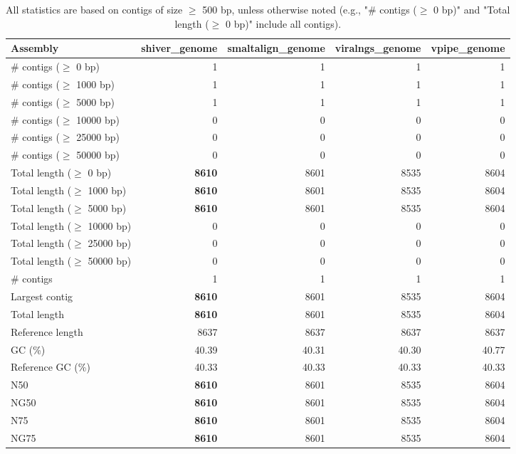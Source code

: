 \documentclass[12pt,a4paper]{article}
\begin{document}
\begin{table}[ht]
\begin{center}
\caption{All statistics are based on contigs of size $\geq$ 500 bp, unless otherwise noted (e.g., "\# contigs ($\geq$ 0 bp)" and "Total length ($\geq$ 0 bp)" include all contigs).}
\begin{tabular}{|l*{4}{|r}|}
\hline
Assembly & shiver\_genome & smaltalign\_genome & viralngs\_genome & vpipe\_genome \\ \hline
\# contigs ($\geq$ 0 bp) & 1 & 1 & 1 & 1 \\ \hline
\# contigs ($\geq$ 1000 bp) & 1 & 1 & 1 & 1 \\ \hline
\# contigs ($\geq$ 5000 bp) & 1 & 1 & 1 & 1 \\ \hline
\# contigs ($\geq$ 10000 bp) & 0 & 0 & 0 & 0 \\ \hline
\# contigs ($\geq$ 25000 bp) & 0 & 0 & 0 & 0 \\ \hline
\# contigs ($\geq$ 50000 bp) & 0 & 0 & 0 & 0 \\ \hline
Total length ($\geq$ 0 bp) & {\bf 8610} & 8601 & 8535 & 8604 \\ \hline
Total length ($\geq$ 1000 bp) & {\bf 8610} & 8601 & 8535 & 8604 \\ \hline
Total length ($\geq$ 5000 bp) & {\bf 8610} & 8601 & 8535 & 8604 \\ \hline
Total length ($\geq$ 10000 bp) & 0 & 0 & 0 & 0 \\ \hline
Total length ($\geq$ 25000 bp) & 0 & 0 & 0 & 0 \\ \hline
Total length ($\geq$ 50000 bp) & 0 & 0 & 0 & 0 \\ \hline
\# contigs & 1 & 1 & 1 & 1 \\ \hline
Largest contig & {\bf 8610} & 8601 & 8535 & 8604 \\ \hline
Total length & {\bf 8610} & 8601 & 8535 & 8604 \\ \hline
Reference length & 8637 & 8637 & 8637 & 8637 \\ \hline
GC (\%) & 40.39 & 40.31 & 40.30 & 40.77 \\ \hline
Reference GC (\%) & 40.33 & 40.33 & 40.33 & 40.33 \\ \hline
N50 & {\bf 8610} & 8601 & 8535 & 8604 \\ \hline
NG50 & {\bf 8610} & 8601 & 8535 & 8604 \\ \hline
N75 & {\bf 8610} & 8601 & 8535 & 8604 \\ \hline
NG75 & {\bf 8610} & 8601 & 8535 & 8604 \\ \hline

\end{tabular}
\end{center}
\end{table}
\end{document}
